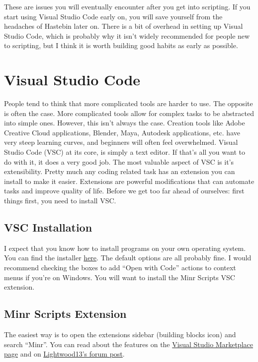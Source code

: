\documentclass[oneside]{book}
\begin{document}
These are issues you will eventually encounter after you get into scripting. If you start using Visual Studio Code early on, you will save yourself from the headaches of Hastebin later on. There is a bit of overhead in setting up Visual Studio Code, which is probably why it isn't widely recommended for people new to scripting, but I think it is worth building good habits as early as possible.

\section{Visual Studio Code}
People tend to think that more complicated tools are harder to use. The opposite is often the case. More complicated tools allow for complex tasks to be abstracted into simple ones. However, this isn't always the case. Creation tools like Adobe Creative Cloud applications, Blender, Maya, Autodesk applications, etc. have very steep learning curves, and beginners will often feel overwhelmed. Visual Studio Code (VSC) at its core, is simply a text editor. If that's all you want to do with it, it does a very good job. The most valuable aspect of VSC is it's extensibility. Pretty much any coding related task has an extension you can install to make it easier. Extensions are powerful modifications that can automate tasks and improve quality of life. Before we get too far ahead of ourselves: first things first, you need to install VSC.

\subsection{VSC Installation}
I expect that you know how to install programs on your own operating system. You can find the installer \href{https://code.visualstudio.com/Download}{here}. The default options are all probably fine. I would recommend checking the boxes to add ``Open with Code'' actions to context menus if you're on Windows. You will want to install the Minr Scripts VSC extension.

\subsection{Minr Scripts Extension}
The easiest way is to open the extensions sidebar (building blocks icon) and search ``Minr''. You can read about the features on the \href{https://marketplace.visualstudio.com/items?itemName=Lightwood13.msc}{Visual Studio Marketplace page} and on \href{https://forums.minr.org/threads/visual-studio-code-extension-for-minr-scripts.6175/}{Lightwood13's forum post}.
\end{document}

